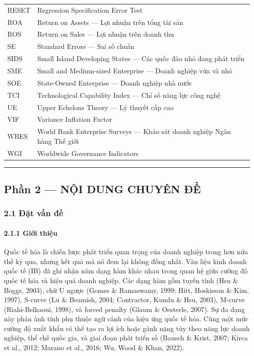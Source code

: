 \documentclass[12pt,a4paper]{article}
\begin{document}
\begin{longtable}[]{@{}ll@{}}
RESET & Regression Specification Error Test \\
ROA & Return on Assets --- Lợi nhuận trên tổng tài sản \\
ROS & Return on Sales --- Lợi nhuận trên doanh thu \\
SE & Standard Errors --- Sai số chuẩn \\
SIDS & Small Island Developing States --- Các quốc đảo nhỏ đang phát
triển \\
SME & Small and Medium-sized Enterprise --- Doanh nghiệp vừa và nhỏ \\
SOE & State-Owned Enterprise --- Doanh nghiệp nhà nước \\
TCI & Technological Capability Index --- Chỉ số năng lực công nghệ \\
UE & Upper Echelons Theory --- Lý thuyết cấp cao \\
VIF & Variance Inflation Factor \\
WBES & World Bank Enterprise Surveys --- Khảo sát doanh nghiệp Ngân hàng
Thế giới \\
WGI & Worldwide Governance Indicators \\
\end{longtable}

\begin{center}\rule{0.5\linewidth}{0.5pt}\end{center}

\hypertarget{phux1ea7n-2--nux1ed9i-dung-chuyuxean-ux111ux1ec1}{%
\subsection{Phần 2 --- NỘI DUNG CHUYÊN
ĐỀ}\label{phux1ea7n-2--nux1ed9i-dung-chuyuxean-ux111ux1ec1}}

\hypertarget{21-ux111ux1eb7t-vux1ea5n-ux111ux1ec1}{%
\subsubsection{2.1 Đặt vấn
đề}\label{21-ux111ux1eb7t-vux1ea5n-ux111ux1ec1}}

\hypertarget{211-giux1edbi-thiux1ec7u}{%
\paragraph{2.1.1 Giới thiệu}\label{211-giux1edbi-thiux1ec7u}}

Quốc tế hóa là chiến lược phát triển quan trọng của doanh nghiệp trong
hơn nửa thế kỷ qua, nhưng kết quả mà nó đem lại không đồng nhất. Văn
liệu kinh doanh quốc tế (IB) đã ghi nhận năm dạng hàm khác nhau trong
quan hệ giữa cường độ quốc tế hóa và hiệu quả doanh nghiệp. Các dạng hàm
gồm tuyến tính (Hsu \& Boggs, 2003), chữ U ngược (Gomes \& Ramaswamy,
1999; Hitt, Hoskisson \& Kim, 1997), S-curve (Lu \& Beamish, 2004;
Contractor, Kundu \& Hsu, 2003), M-curve (Riahi-Belkaoui, 1998), và
forced penalty (Glaum \& Oesterle, 2007). Sự đa dạng này phản ánh tính
phụ thuộc ngữ cảnh của hiệu ứng quốc tế hóa. Cùng một mức cường độ xuất
khẩu có thể tạo ra lợi ích hoặc gánh nặng tùy theo năng lực doanh
nghiệp, thể chế quốc gia, và giai đoạn phát triển số (Bausch \& Krist,
2007; Kirca et al., 2012; Marano et al., 2016; Wu, Wood \& Khan, 2022).
\end{document}

